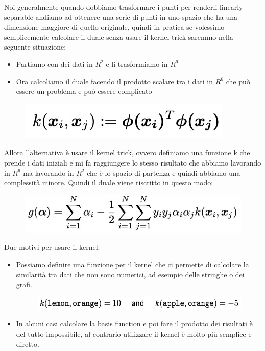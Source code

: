 \documentclass[14pt]{extreport}
\begin{document}
Noi generalmente quando dobbiamo trasformare i punti per renderli linearly separable andiamo ad ottenere una serie di punti in uno spazio che ha una
dimensione maggiore di quello originale, quindi in pratica se volessimo semplicemente calcolare il duale senza usare il kernel trick saremmo nella
seguente situazione:
\begin{itemize}
	\item Partiamo con dei dati in $R^2$ e li trasformiamo in $R^6$
	\item Ora calcoliamo il duale facendo il prodotto scalare tra i dati in $R^6$ che può essere un problema e può essere complicato
\end{itemize}

\begin{figure}[H]
	\centering
	\includegraphics[width=0.4\linewidth]{336.jpeg}
\end{figure}
Allora l'alternativa è usare il kernel trick, ovvero definiamo una funzione k che prende i dati iniziali e mi fa raggiungere lo stesso risultato che
abbiamo lavorando in $R^6$ ma lavorando in $R^2$ che è lo spazio di partenza e quindi abbiamo una complessità minore. Quindi il duale viene riscritto
in questo modo:
\begin{figure}[H]
	\centering
	\includegraphics[width=0.5\linewidth]{337.jpeg}
\end{figure}

Due motivi per usare il kernel:
\begin{itemize}
	\item Possiamo definire una funzione per il kernel che ci permette di calcolare la similarità tra dati che non sono numerici, ad esempio delle
	stringhe o dei grafi.
	      \begin{figure}[H]
		      \centering
		      \includegraphics[width=0.4\linewidth]{338.jpeg}
	      \end{figure}
	\item In alcuni casi calcolare la basis function e poi fare il prodotto dei risultati è del tutto impossibile, al contrario utilizzare il kernel è
	molto più semplice e diretto.
\end{itemize}
\end{document}

